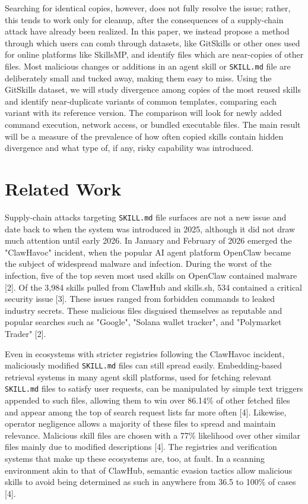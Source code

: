 \documentclass[sigconf,review]{acmart}
\begin{document}
Searching for identical copies, however, does not fully resolve the issue; rather, this tends to work only for cleanup, after the consequences of a supply-chain attack have already been realized. In this paper, we instead propose a method through which users can comb through datasets, like GitSkills or other ones used for online platforms like SkillsMP, and identify files which are near-copies of other files. Most malicious changes or additions in an agent skill or \texttt{SKILL.md} file are deliberately small and tucked away, making them easy to miss. Using the GitSkills dataset, we will study divergence among copies of the most reused skills and identify near-duplicate variants of common templates, comparing each variant with its reference version. The comparison will look for newly added command execution, network access, or bundled executable files. The main result will be a measure of the prevalence of how often copied skills contain hidden divergence and what type of, if any, risky capability was introduced.

\section{Related Work}
\label{Section:RelatedWork}
Supply-chain attacks targeting \texttt{SKILL.md} file surfaces are not a new issue and date back to when the system was introduced in 2025, although it did not draw much attention until early 2026. In January and February of 2026 emerged the "ClawHavoc" incident, when the popular AI agent platform OpenClaw became the subject of widespread malware and infection. During the worst of the infection, five of the top seven most used skills on OpenClaw contained malware [2]. Of the 3,984 skills pulled from ClawHub and skills.sh, 534 contained a critical security issue [3]. These issues ranged from forbidden commands to leaked industry secrets. These malicious files disguised themselves as reputable and popular searches such as "Google", "Solana wallet tracker", and "Polymarket Trader" [2].

Even in ecosystems with stricter registries following the ClawHavoc incident, maliciously modified \texttt{SKILL.md} files can still spread easily. Embedding-based retrieval systems in many agent skill platforms, used for fetching relevant \texttt{SKILL.md} files to satisfy user requests, can be manipulated by simple text triggers appended to such files, allowing them to win over 86.14\% of other fetched files and appear among the top of search request lists far more often [4]. Likewise, operator negligence allows a majority of these files to spread and maintain relevance. Malicious skill files are chosen with a 77\% likelihood over other similar files mainly due to modified descriptions [4]. The registries and verification systems that make up these ecosystems are, too, at fault. In a scanning environment akin to that of ClawHub, semantic evasion tactics allow malicious skills to avoid being determined as such in anywhere from 36.5 to 100\% of cases [4].
\end{document}
